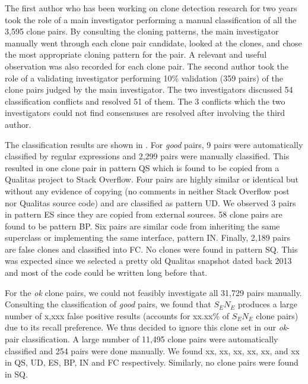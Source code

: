 \documentclass{sig-alternate-05-2015}
\begin{document}
The first author who has been working on clone detection research for two years took the role of a main investigator performing a manual classification of all the 3,595 clone pairs. By consulting the cloning patterns, the main investigator manually went through each clone pair candidate, looked at the clones, and chose the most appropriate cloning pattern for the pair. A relevant and useful observation was also recorded for each clone pair. The second author took the role of a validating investigator performing 10\% validation (359 pairs) of the clone pairs judged by the main investigator. The two investigators discussed 54 classification conflicts and resolved 51 of them. The 3 conflicts which the two investigators could not find consensuses are resolved after involving the third author. 

The classification results are shown in . For \textit{good} pairs, 9 pairs were automatically classified by regular expressions and 2,299 pairs were manually classified. This resulted in one clone pair in pattern QS which is found to be copied from a Qualitas project to Stack Overflow. Four pairs are highly similar or identical but without any evidence of copying (no comments in neither Stack Overflow post nor Qualitas source code) and are classified as pattern UD. We observed 3 pairs in pattern ES since they are copied from external sources. 58 clone pairs are found to be pattern BP. Six pairs are similar code from inheriting the same superclass or implementing the same interface, pattern IN. Finally, 2,189 pairs are false clones and classified into FC. No clones were found in pattern SQ. This was expected since we selected a pretty old Qualitas snapshot dated back 2013 and most of the code could be written long before that.  

For the \textit{ok} clone pairs, we could not feasibly investigate all 31,729 pairs manually.  Consulting the classification of \textit{good} pairs, we found that $S_EN_E$ produces a large number of x,xxx false positive results (accounts for xx.xx\% of $S_EN_E$ clone pairs) due to its recall preference. We thus decided to ignore this clone set in our \textit{ok}-pair classification. A large number of 11,495 clone pairs were automatically classified and 254 pairs were done manually. We found xx, xx, xx, xx, xx, and xx in QS, UD, ES, BP, IN and FC respectively. Similarly, no clone pairs were found in SQ. 
\end{document}

